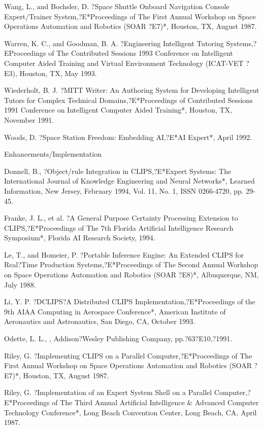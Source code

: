 \documentclass[letterpaper,10pt,english]{sphinxmanual}
\begin{document}
Wang, L., and Bochsler, D. ?Space Shuttle Onboard Navigation Console
Expert/Trainer System,?E*Proceedings of The First Annual Workshop on
Space Operations Automation and Robotics (SOAR ?E7)*, Houston, TX,
August 1987.

Warren, K. C., and Goodman, B. A. ?Engineering Intelligent Tutoring
Systems,?EProceedings of The Contributed Sessions 1993 Conference on
Intelligent Computer Aided Training and Virtual Environment Technology
(ICAT-VET ?E3), Houston, TX, May 1993.

Wiederholt, B. J. ?MITT Writer: An Authoring System for Developing
Intelligent Tutors for Complex Technical Domains,?E*Proceedings of
Contributed Sessions 1991 Conference on Intelligent Computer Aided
Training*, Houston, TX, November 1991.

Woods, D. ?Space Station Freedom: Embedding AI,?E*AI Expert*, April
1992.

Enhancements/Implementation

Donnell, B., ?Object/rule Integration in CLIPS,?E*Expert Systems: The
International Journal of Knowledge Engineering and Neural Networks*,
Learned Information, New Jersey, February 1994, Vol. 11, No. 1, ISSN
0266-4720, pp. 29-45.

Franke, J. L., et al. ?A General Purpose Certainty Processing Extension
to CLIPS,?E*Proceedings of The 7th Florida Artificial Intelligence
Research Symposium*, Florida AI Research Society, 1994.

Le, T., and Homeier, P. ?Portable Inference Engine: An Extended CLIPS
for Real?Time Production Systems,?E*Proceedings of The Second Annual
Workshop on Space Operations Automation and Robotics (SOAR ?E8)*,
Albuquerque, NM, July 1988.

Li, Y. P. ?DCLIPS?A Distributed CLIPS Implementation,?E*Proceedings of
the 9th AIAA Computing in Aerospace Conference*, American Institute of
Aeronautics and Astronautics, San Diego, CA, October 1993.

Odette, L. L., , Addison?Wesley Publishing
Company, pp.?63?E10,?1991.

Riley, G. ?Implementing CLIPS on a Parallel Computer,?E*Proceedings of
The First Annual Workshop on Space Operations Automation and Robotics
(SOAR ?E7)*, Houston, TX, August 1987.

Riley, G. ?Implementation of an Expert System Shell on a Parallel
Computer,?E*Proceedings of The Third Annual Artificial Intelligence \&
Advanced Computer Technology Conference*, Long Beach Convention Center,
Long Beach, CA, April 1987.
\end{document}

